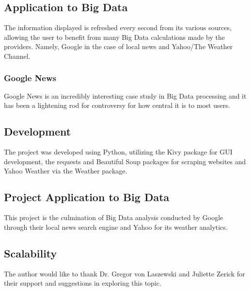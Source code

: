 \documentclass[sigconf]{acmart}
\begin{document}
\subsection{Application to Big Data}
The information displayed is refreshed every second from its various sources, allowing the user to benefit from many Big Data calculations made by the providers. Namely, Google in the case of local news and Yahoo/The Weather Channel. 
\subsubsection{Google News}
Google News is an incredibly interesting case study in Big Data processing and it has been a lightening rod for controversy for how central it is to most users. 


\subsection{Development}
The project was developed using Python, utilizing the Kivy package for GUI development, the requests and Beautiful Soup packages for scraping websites and Yahoo Weather via the Weather package. 
\subsection{Project Application to Big Data}


This project is the culmination of Big Data analysis conducted by Google through their local news search engine and Yahoo for its weather analytics. 

\subsection{Scalability}





 
 
 
\begin{acks}
The author would like to thank Dr. Gregor von Laszewski and Juliette Zerick for their support and suggestions in exploring this topic.\cite{awsmkt}
\end{acks}


 

%
\end{document}
